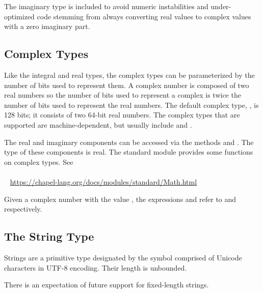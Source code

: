 \begin{rationale}
The imaginary type is included to avoid numeric instabilities and
under-optimized code stemming from always converting real values to
complex values with a zero imaginary part.
\end{rationale}

\subsection{Complex Types}
\label{Complex_Types}

Like the integral and real types, the complex types can be
parameterized by the number of bits used to represent them.  A complex
number is composed of two real numbers so the number of bits used to
represent a complex is twice the number of bits used to represent the
real numbers.  The default complex type, , is 128 bits;
it consists of two 64-bit real numbers.  The complex types that are
supported are machine-dependent, but usually
include  and .

The real and imaginary components can be accessed via the methods
 and .  The type of these components is real.
The standard  module provides some functions on
complex types. See
\\ %
\mbox{$$ $$ $$ $$ $$} %
\url{https://chapel-lang.org/docs/modules/standard/Math.html}

\begin{example}
Given a complex number  with the value , the
expressions  and  refer to 
and  respectively.
\end{example}

\subsection{The String Type}
\label{The_String_Type}

Strings are a primitive type designated by the symbol  comprised of
Unicode characters in UTF-8 encoding.  Their length is unbounded.

\begin{openissue}
There is an expectation of future support for fixed-length strings.
\end{openissue}

